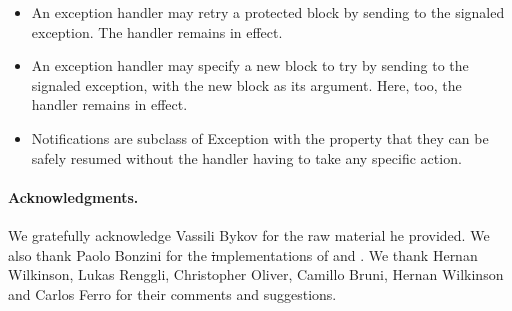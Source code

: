 \begin{itemize}
\item An exception handler may retry a protected block by sending  to the signaled exception. The handler remains in effect.

\item An exception handler may specify a new block to try by sending  to the signaled exception, with the new block as its argument. Here, too, the handler remains in effect.

\item Notifications are subclass of Exception with the property that they can be safely resumed without the handler having to take any specific action.

\end{itemize}

\paragraph{Acknowledgments.} We gratefully acknowledge Vassili Bykov for the raw material he provided. We also thank Paolo Bonzini for the \st implementations of  and . We thank Hernan Wilkinson, Lukas Renggli, Christopher Oliver, Camillo Bruni, Hernan Wilkinson and  Carlos Ferro for their comments and suggestions.

\ifx\wholebook\relax\else
   
   
\fi

